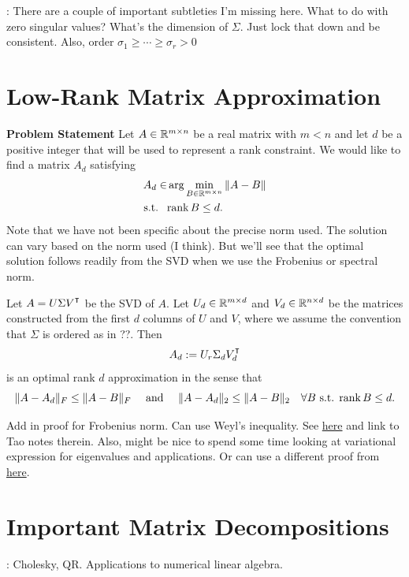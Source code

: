 : There are a couple of important subtleties I'm missing here. What to do with zero singular values? What's the dimension of $\Sigma$. Just lock that down and be consistent. Also, order $\sigma_1 \geq \cdots \geq \sigma_r > 0$

\section{Low-Rank Matrix Approximation}
\noindent \textbf{Problem Statement}
Let $A\in \mathbb{R}^{m\times n}$ be a real matrix with $m< n$ and let $d$ be a positive integer that will be used to represent a rank constraint. We would like to find a matrix $A_d$ satisfying 
\begin{align}
A_d \in & \arg\min_{B\in \mathbb{R}^{m\times n}} \|A - B\|\\
\mbox{s.t. } ~ & \textup{rank}\,{B} \leq d.
\end{align}
Note that we have not been specific about the precise norm used. The solution can vary based on the norm used (I think). But we'll see that the optimal solution follows readily from the SVD when we use the Frobenius or spectral norm. 

\begin{theorem}
Let $A = U\Sigma V^\T$ be the SVD of $A$. Let $U_d\in \mathbb{R}^{m\times d}$ and $V_d\in \mathbb{R}^{n\times d}$ be the matrices constructed from the first $d$ columns of $U$ and $V$, where we assume the convention that $\Sigma$ is ordered as in ??. 
Then
$$
A_d := U_r \Sigma_d V_d^\T
$$
is an optimal rank $d$ approximation in the sense that
$$
\|A - A_d\|_F \leq \|A - B\|_F \quad \mbox{ and } \quad \|A - A_d\|_2 \leq \|A - B\|_2 \quad \forall B \mbox{ s.t. } \textup{rank}\,{B} \leq d.
$$
\end{theorem}

 Add in proof for Frobenius norm. Can use Weyl's inequality. See \href{https://en.wikipedia.org/wiki/Weyl\%27s_inequality}{here} and link to Tao notes therein. Also, might be nice to spend some time looking at variational expression for eigenvalues and applications. Or can use a different proof from \href{https://people.math.osu.edu/costin.10/5101/Low\%20rank\%20Approx.pdf}{here}.

\section{Important Matrix Decompositions}
: Cholesky, QR. Applications to numerical linear algebra. 

